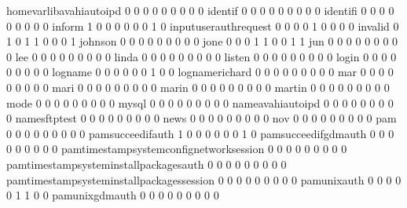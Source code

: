 \documentclass[compress,8pt]{beamer}
\begin{document}
\begin{frame}
\begin{Schunk}
  homevarlibavahiautoipd                     0   0   0   0   0   0   0   0   0
  identif                                    0   0   0   0   0   0   0   0   0
  identifi                                   0   0   0   0   0   0   0   0   0
  inform                                     1   0   0   0   0   0   0   1   0
  inputuserauthrequest                       0   0   0   0   1   0   0   0   0
  invalid                                    0   1   0   1   1   0   0   0   1
  johnson                                    0   0   0   0   0   0   0   0   0
  jone                                       0   0   0   1   1   0   0   1   1
  jun                                        0   0   0   0   0   0   0   0   0
  lee                                        0   0   0   0   0   0   0   0   0
  linda                                      0   0   0   0   0   0   0   0   0
  listen                                     0   0   0   0   0   0   0   0   0
  login                                      0   0   0   0   0   0   0   0   0
  logname                                    0   0   0   0   0   0   1   0   0
  lognamerichard                             0   0   0   0   0   0   0   0   0
  mar                                        0   0   0   0   0   0   0   0   0
  mari                                       0   0   0   0   0   0   0   0   0
  marin                                      0   0   0   0   0   0   0   0   0
  martin                                     0   0   0   0   0   0   0   0   0
  mode                                       0   0   0   0   0   0   0   0   0
  mysql                                      0   0   0   0   0   0   0   0   0
  nameavahiautoipd                           0   0   0   0   0   0   0   0   0
  namesftptest                               0   0   0   0   0   0   0   0   0
  news                                       0   0   0   0   0   0   0   0   0
  nov                                        0   0   0   0   0   0   0   0   0
  pam                                        0   0   0   0   0   0   0   0   0
  pamsucceedifauth                           1   0   0   0   0   0   0   1   0
  pamsucceedifgdmauth                        0   0   0   0   0   0   0   0   0
  pamtimestampsystemconfignetworksession     0   0   0   0   0   0   0   0   0
  pamtimestampsysteminstallpackagesauth      0   0   0   0   0   0   0   0   0
  pamtimestampsysteminstallpackagessession   0   0   0   0   0   0   0   0   0
  pamunixauth                                0   0   0   0   0   1   1   0   0
  pamunixgdmauth                             0   0   0   0   0   0   0   0   0

\end{Schunk}
\end{frame}
\end{document}
